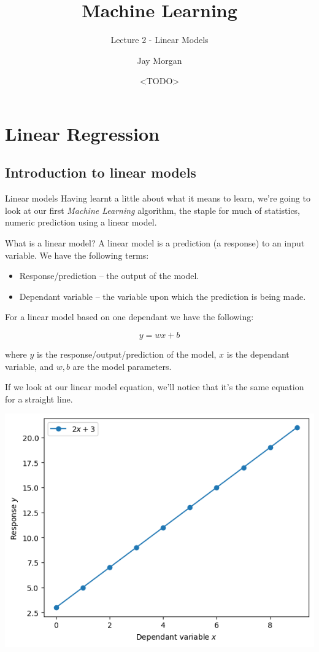 \documentclass[10pt]{beamer}
\author{Jay Morgan}
\date{<TODO>}
\title{Machine Learning}
\subtitle{Lecture 2 - Linear Models}
\begin{document}
\maketitle

\section*{Linear Regression}
\label{sec:org4469d39}

\subsection*{Introduction to linear models}
\label{sec:orgec15021}

\begin{frame}[label={sec:org36e9e7f}]{Linear models}
Having learnt a little about what it means to learn, we're going to look at our first
\emph{Machine Learning} algorithm, the staple for much of statistics, numeric prediction
using a linear model.
\end{frame}

\begin{frame}[fragile,allowframebreaks,label=]{What is a linear model?}
A linear model is a prediction (a response) to an input variable. We have the
following terms:

\begin{itemize}
\item Response/prediction -- the output of the model.
\item Dependant variable -- the variable upon which the prediction is being made.
\end{itemize}

For a linear model based on one dependant we have the following:

\[
y = w x + b
\]

where \(y\) is the response/output/prediction of the model, \(x\) is the dependant
variable, and \(w, b\) are the model parameters.

If we look at our linear model equation, we'll notice that it's the same equation for a straight line.

\begin{center}
\includegraphics[width=.9\linewidth]{images/linear_model.png}
\end{center}
\end{frame}
\end{document}

